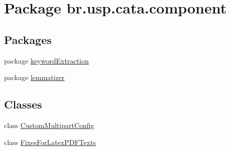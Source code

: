\hypertarget{namespacebr_1_1usp_1_1cata_1_1component}{\section{Package br.\+usp.\+cata.\+component}
\label{namespacebr_1_1usp_1_1cata_1_1component}
}
\subsection*{Packages}
\begin{DoxyCompactItemize}
\item 
package \hyperlink{namespacebr_1_1usp_1_1cata_1_1component_1_1keyword_extraction}{keyword\+Extraction}
\item 
package \hyperlink{namespacebr_1_1usp_1_1cata_1_1component_1_1lemmatizer}{lemmatizer}
\end{DoxyCompactItemize}
\subsection*{Classes}
\begin{DoxyCompactItemize}
\item 
class \hyperlink{classbr_1_1usp_1_1cata_1_1component_1_1_custom_multipart_config}{Custom\+Multipart\+Config}
\item 
class \hyperlink{classbr_1_1usp_1_1cata_1_1component_1_1_fixes_for_latex_p_d_f_texts}{Fixes\+For\+Latex\+P\+D\+F\+Texts}
\end{DoxyCompactItemize}
